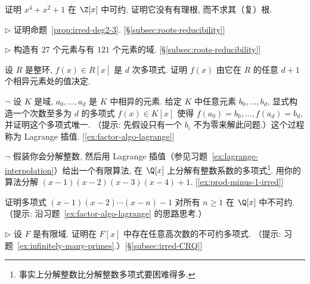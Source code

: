 \begin{prob}
\label{ex:x4+x2+1-reducible}
证明 $x^4+x^2+1$ 在 $\Z[x]$ 中可约. 证明它没有有理根, 而不求其（复）根.
\end{prob}

\begin{prob}
\label{ex:prove-prop5.3}
$\triangleright$ 证明命题~\ref{prop:irred-deg2-3}. [§\ref{subsec:roots-reducibility}]
\end{prob}

\begin{prob}
\label{ex:fields-27-121}
$\triangleright$ 构造有 $27$ 个元素与有 $121$ 个元素的域. [§\ref{subsec:roots-reducibility}]
\end{prob}

\begin{prob}
\label{ex:poly-det-by-values}
设 $R$ 是整环, $f(x)\in R[x]$ 是 $d$ 次多项式. 证明 $f(x)$ 由它在 $R$ 的任意 $d+1$ 个相异元素处的值决定.
\end{prob}

\begin{prob}
\label{ex:lagrange-interpolation}
$\neg$ 设 $K$ 是域, $a_0,\ldots,a_d$ 是 $K$ 中相异的元素. 给定 $K$ 中任意元素 $b_0,\ldots,b_d$, 显式构造一个次数至多为 $d$ 的多项式 $f(x)\in K[x]$ 使得 $f(a_0)=b_0,\ldots,f(a_d)=b_d$, 并证明这个多项式唯一. （提示: 先假设只有一个 $b_i$ 不为零来解此问题.）这个过程称为 Lagrange 插值. [\ref{ex:factor-algo-lagrange}]
\end{prob}

\begin{prob}
\label{ex:factor-algo-lagrange}
$\neg$ 假装你会分解整数, 然后用 Lagrange 插值（参见习题~\ref{ex:lagrange-interpolation}）给出一个有限算法, 在 $\Q[x]$ 上分解有整数系数的多项式\footnote{事实上分解整数比分解整数多项式要困难得多.}. 用你的算法分解 $(x-1)(x-2)(x-3)(x-4)+1$. [\ref{ex:prod-minus-1-irred}]
\end{prob}

\begin{prob}
\label{ex:prod-minus-1-irred}
证明多项式 $(x-1)(x-2)\cdots(x-n)-1$ 对所有 $n\geq 1$ 在 $\Q[x]$ 中不可约. （提示: 沿习题~\ref{ex:factor-algo-lagrange} 的思路思考.）
\end{prob}

\begin{prob}
\label{ex:finite-field-irred-arbitrary}
$\triangleright$ 设 $F$ 是有限域. 证明在 $F[x]$ 中存在任意高次数的不可约多项式. （提示: 习题~\ref{ex:infinitely-many-primes}.）[§\ref{subsec:irred-CRQ}]
\end{prob}

